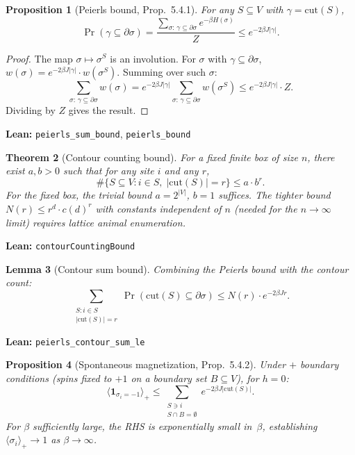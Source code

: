 \documentclass[a4paper,11pt]{article}
\newtheorem{theorem}{Theorem}
\newtheorem{lemma}[theorem]{Lemma}
\newtheorem{proposition}[theorem]{Proposition}
\begin{document}
\begin{proposition}[Peierls bound, Prop.~5.4.1]
For any $S \subseteq V$ with $\gamma = \mathrm{cut}(S)$,
\[
  \Pr(\gamma \subseteq \partial\sigma)
  = \frac{\sum_{\sigma:\,\gamma \subseteq \partial\sigma}
          e^{-\beta H(\sigma)}}{Z}
  \le e^{-2\beta J |\gamma|}.
\]
\end{proposition}

\begin{proof}
The map $\sigma \mapsto \sigma^S$ is an involution. For $\sigma$ with
$\gamma \subseteq \partial\sigma$,
$w(\sigma) = e^{-2\beta J|\gamma|} \cdot w(\sigma^S)$.
Summing over such $\sigma$:
\[
  \sum_{\sigma:\,\gamma \subseteq \partial\sigma} w(\sigma)
  = e^{-2\beta J|\gamma|}
    \sum_{\sigma:\,\gamma \subseteq \partial\sigma} w(\sigma^S)
  \le e^{-2\beta J|\gamma|} \cdot Z.
\]
Dividing by $Z$ gives the result.
\end{proof}

\noindent\textbf{Lean:} \texttt{peierls\_sum\_bound}, \texttt{peierls\_bound}

\begin{theorem}[Contour counting bound]
For a fixed finite box of size $n$, there exist $a, b > 0$ such that
for any site $i$ and any $r$,
\[
  \#\{S \subseteq V : i \in S,\; |\mathrm{cut}(S)| = r\} \le a \cdot b^r.
\]
For the fixed box, the trivial bound $a = 2^{|V|}$, $b = 1$ suffices.
The tighter bound $N(r) \le r^d \cdot c(d)^r$ with constants independent
of $n$ (needed for the $n \to \infty$ limit) requires lattice animal
enumeration.
\end{theorem}

\noindent\textbf{Lean:} \texttt{contourCountingBound}

\begin{lemma}[Contour sum bound]
Combining the Peierls bound with the contour count:
\[
  \sum_{\substack{S : i \in S \\ |\mathrm{cut}(S)| = r}}
  \Pr(\mathrm{cut}(S) \subseteq \partial\sigma)
  \le N(r) \cdot e^{-2\beta J r}.
\]
\end{lemma}

\noindent\textbf{Lean:} \texttt{peierls\_contour\_sum\_le}

\begin{proposition}[Spontaneous magnetization, Prop.~5.4.2]
Under $+$ boundary conditions (spins fixed to $+1$ on a boundary set
$B \subseteq V$), for $h = 0$:
\[
  \langle \mathbf{1}_{\sigma_i = -1} \rangle_+
  \le \sum_{\substack{S \ni i \\ S \cap B = \emptyset}}
      e^{-2\beta J |\mathrm{cut}(S)|}.
\]
For $\beta$ sufficiently large, the RHS is exponentially small in~$\beta$,
establishing $\langle \sigma_i \rangle_+ \to 1$ as $\beta \to \infty$.
\end{proposition}
\end{document}
